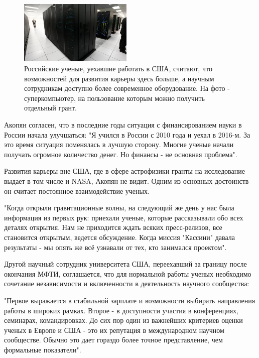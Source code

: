 \begin{figure}
    \begin{center}
        \includegraphics[width=0.48\textwidth]{img/supercomputer.png}
    \end{center}
    \caption{Российские ученые, уехавшие работать в США, считают, что возможностей для развития карьеры здесь больше, а научным сотрудникам доступно более современное оборудование. На фото - суперкомпьютер, на пользование которым можно получить отдельный грант.}
\end{figure}
Акопян согласен, что в последние годы ситуация с финансированием науки в России начала улучшаться: "Я учился в России с 2010 года и уехал в 2016-м. За это время ситуация поменялась в лучшую сторону. Многие ученые начали получать огромное количество денег. Но финансы - не основная проблема".

Развития карьеры вне США, где в сфере астрофизики гранты на исследование выдает в том числе и NASA, Акопян не видит. Одним из основных достоинств он считает постоянное взаимодействие ученых.

"Когда открыли гравитационные волны, на следующий же день у нас была информация из первых рук: приехали ученые, которые рассказывали обо всех деталях открытия. Нам не приходится ждать всяких пресс-релизов, все становится открытым, ведется обсуждение. Когда миссия "Кассини" давала результаты - мы опять же всё узнавали от тех, кто занимался проектом".

Другой научный сотрудник университета США, переехавший за границу после окончания МФТИ, соглашается, что для нормальной работы ученых необходимо сочетание независимости и включенности в деятельность научного сообщества:


"Первое выражается в стабильной зарплате и возможности выбирать направления работы в широких рамках. Второе - в доступности участия в конференциях, семинарах, командировках. До сих пор один из важнейших критериев оценки ученых в Европе и США - это их репутация в международном научном сообществе. Обычно это дает гораздо более точное представление, чем формальные показатели".

